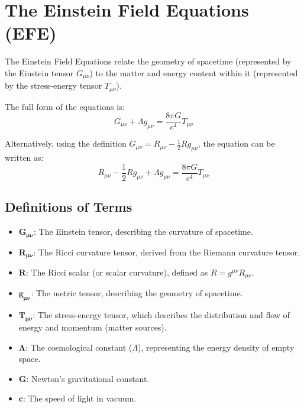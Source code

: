 \documentclass{article}
\begin{document}
\section*{The Einstein Field Equations (EFE)}

The Einstein Field Equations relate the geometry of spacetime (represented by the Einstein tensor $G_{\mu\nu}$) to the matter and energy content within it (represented by the stress-energy tensor $T_{\mu\nu}$).

The full form of the equations is:
\begin{equation}
G_{\mu\nu} + \Lambda g_{\mu\nu} = \frac{8\pi G}{c^4} T_{\mu\nu}
\end{equation}

Alternatively, using the definition $G_{\mu\nu} = R_{\mu\nu} - \frac{1}{2} R g_{\mu\nu}$, the equation can be written as:
\begin{equation}
R_{\mu\nu} - \frac{1}{2} R g_{\mu\nu} + \Lambda g_{\mu\nu} = \frac{8\pi G}{c^4} T_{\mu\nu}
\end{equation}

\subsection*{Definitions of Terms}
\begin{itemize}
    \item $\mathbf{G_{\mu\nu}}$: The Einstein tensor, describing the curvature of spacetime.
    \item $\mathbf{R_{\mu\nu}}$: The Ricci curvature tensor, derived from the Riemann curvature tensor.
    \item $\mathbf{R}$: The Ricci scalar (or scalar curvature), defined as $R = g^{\mu\nu} R_{\mu\nu}$.
    \item $\mathbf{g_{\mu\nu}}$: The metric tensor, describing the geometry of spacetime.
    \item $\mathbf{T_{\mu\nu}}$: The stress-energy tensor, which describes the distribution and flow of energy and momentum (matter sources).
    \item $\mathbf{\Lambda}$: The cosmological constant ($\Lambda$), representing the energy density of empty space.
    \item $\mathbf{G}$: Newton's gravitational constant.
    \item $\mathbf{c}$: The speed of light in vacuum.
\end{itemize}
\end{document}
